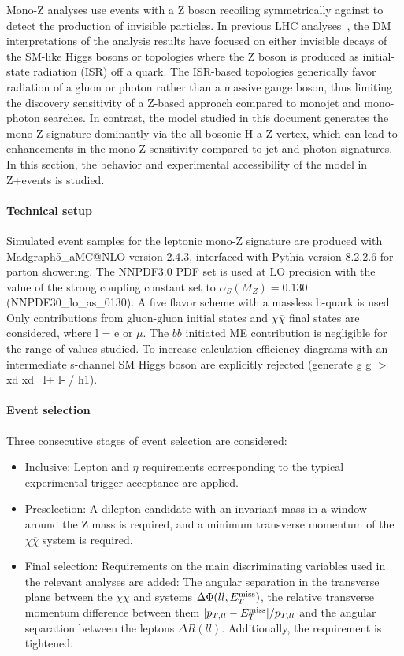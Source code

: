 Mono-Z analyses use events with a Z boson recoiling symmetrically against \MET to detect the production of invisible particles.
In previous LHC analyses~\cite{Aaboud:2017bja,Sirunyan:2017qfc}, the DM interpretations of the analysis results have focused on either invisible decays of the SM-like Higgs bosons or topologies where the Z boson is produced as initial-state radiation (ISR) off a quark. The ISR-based topologies generically favor radiation of a gluon or photon rather than a massive gauge boson, thus limiting the discovery sensitivity of a Z-based approach compared to monojet and mono-photon searches. In contrast, the model studied in this document generates the mono-Z signature dominantly via the all-bosonic H-a-Z vertex, which can lead to enhancements in the mono-Z sensitivity compared to jet and photon signatures. In this section, the behavior and experimental accessibility of the model in Z+\MET events is studied.

\paragraph{Technical setup}
Simulated event samples for the leptonic mono-Z signature are produced with Madgraph5\_aMC@NLO version 2.4.3, interfaced with Pythia version 8.2.2.6 for parton showering. The NNPDF3.0 PDF set is used at LO precision with the value of the strong coupling constant set to $\alpha_{S}(M_{Z}) = 0.130$ (NNPDF30\_lo\_as\_0130). A five flavor scheme with a massless b-quark is used.  Only contributions from gluon-gluon initial states and \lp\lm$\chi\overline{\chi}$ final states are considered, where l = e or $\mu$.  The $bb$ initiated ME contribution is negligible for the range of \tanb values studied.  To increase calculation efficiency diagrams with an intermediate s-channel SM Higgs boson are explicitly rejected (generate g g $>$ xd xd~ l+ l- / h1).


\paragraph{Event selection}
Three consecutive stages of event selection are considered:
\begin{itemize}
\item Inclusive: Lepton \pt and $\eta$ requirements corresponding to the typical experimental trigger acceptance are applied.

\item Preselection: A dilepton candidate with an invariant mass in a window around the Z mass is required, and a minimum transverse momentum of the $\chi\overline{\chi}$ system is required.

\item Final selection: Requirements on the main discriminating variables used in the relevant analyses are added: The angular separation in the transverse plane between the $\chi\overline{\chi}$ and \lp\lm systems $\Delta\Phi(ll,E_T^\mathrm{miss})$, the relative transverse momentum difference between them $|p_{T,ll} - E_T^\mathrm{miss}|/p_{T,ll}$ and the angular separation between the leptons $\Delta R(ll)$. Additionally, the \MET requirement is tightened.
\end{itemize}

